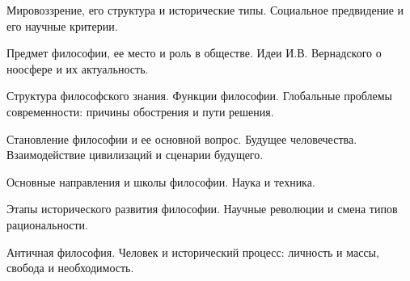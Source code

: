 \documentclass[
	14pt,
	a4paper,
	]
	{scrartcl}
\begin{document}
\shapk
{}
\setcounter{zad}{0}

\vfill
\z 	Мировоззрение, его структура и исторические типы.
 \vfill
\z 	Социальное предвидение и его научные критерии. \vfill

\vfill

\newpage


\shapk
{}
\setcounter{zad}{0}

\vfill
\z 	Предмет философии, ее место и роль в обществе.
 \vfill
\z 	Идеи И.В. Вернадского о ноосфере и их актуальность.
 \vfill

\vfill

\newpage


\shapk
{}
\setcounter{zad}{0}

\vfill
\z 	Структура философского знания. Функции философии.
 \vfill
\z 	Глобальные проблемы современности: причины обострения и пути решения.
 \vfill

\vfill

\newpage


\shapk
{}
\setcounter{zad}{0}

\vfill
\z 	Становление философии и ее основной вопрос.
 \vfill
\z 	Будущее человечества. Взаимодействие цивилизаций и сценарии будущего.
 \vfill

\vfill

\newpage


\shapk
{}
\setcounter{zad}{0}

\vfill
\z 	Основные направления и школы философии. 
 \vfill
\z 	Наука и техника.
 \vfill

\vfill

\newpage


\shapk
{}
\setcounter{zad}{0}

\vfill
\z 	Этапы исторического развития философии.
 \vfill
\z 	Научные революции и смена типов рациональности.
 \vfill

\vfill

\newpage


\shapk
{}
\setcounter{zad}{0}

\vfill
\z 	Античная философия.
 \vfill
\z 	Человек и исторический процесс: личность и массы, свобода и необходимость.
 \vfill

\vfill

\newpage


\shapk
{}
\setcounter{zad}{0}
\end{document}
